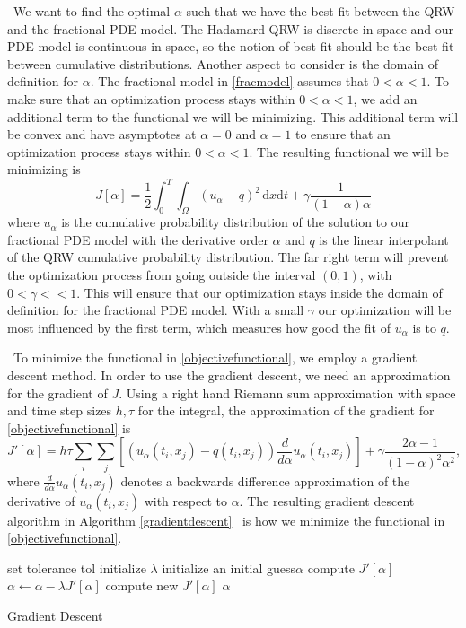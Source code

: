 \documentclass{siamart1116}
\newcommand{\LB}[1]{{\color{blue}~\textsf{#1}}}
\begin{document}
\LB{We want to find the optimal $\alpha$ such that we have the best fit between the QRW and the fractional PDE model. The Hadamard QRW is discrete in space and our PDE model is continuous in space, so the notion of best fit should be the best fit between cumulative distributions. Another aspect to consider is the domain of definition for $\alpha$. The fractional model in \eqref{fracmodel} assumes that $0<\alpha<1$. To make sure that an optimization process stays within $0<\alpha<1$, we add an additional term to the functional we will be minimizing. This additional term will be convex and have asymptotes at $\alpha=0$ and $\alpha = 1$ to ensure that an optimization process stays within $0<\alpha<1$. The resulting} functional we will be minimizing is 
\begin{equation}\label{objectivefunctional}
J[\alpha] = \frac{1}{2}\int_0^T\int_{\Omega}(u_\alpha-q)^2\, \mathrm{d}x\mathrm{d}t+\gamma\frac{1}{(1-\alpha)\alpha}
\end{equation}
where $u_\alpha$ is the cumulative probability distribution of the solution to our fractional PDE model with the derivative order $\alpha$ and $q$ is the linear interpolant of the QRW cumulative probability distribution. The far right term will prevent the optimization process from going outside the interval $(0,1)$, with $0<\gamma<<1$. This will ensure that our optimization stays inside the domain of definition for the fractional PDE model. With a small $\gamma$ our optimization will be most influenced by the first term, which measures how good the fit of $u_\alpha$ is to $q$. 

\LB{To minimize the functional in \eqref{objectivefunctional}, we employ a gradient descent method. In order to use the gradient descent, we need an approximation for the gradient of $J$.} Using a right hand Riemann sum approximation with space and time step sizes $h,\tau$ for the integral, the approximation of the gradient for \eqref{objectivefunctional} is
\begin{equation}\label{functionalgradient}
J'[\alpha] = h\tau\sum_{i}\sum_{j}\left[(u_\alpha(t_i,x_j)-q(t_i,x_j))\frac{d}{d\alpha}u_\alpha(t_i,x_j)\right]+\gamma\frac{2\alpha-1}{(1-\alpha)^2\alpha^2},
\end{equation}
where $\frac{d}{d\alpha}u_\alpha(t_i,x_j)$ denotes a backwards difference approximation of the derivative of $u_\alpha(t_i,x_j)$ with respect to $\alpha$. The resulting gradient descent algorithm in Algorithm \ref{gradientdescent} \LB{is how we minimize} the functional in \eqref{objectivefunctional}.
\begin{algorithm}[H]
\begin{algorithmic}[1]
\STATE set tolerance tol
\STATE initialize $\lambda$
\STATE initialize an initial guess$\alpha$
\STATE compute $J'[\alpha]$
\STATE $\alpha \leftarrow \alpha-\lambda J'[\alpha]$
\STATE compute new $J'[\alpha]$
\ENDWHILE
\RETURN $\alpha$
\end{algorithmic}
\caption{Gradient Descent }
\label{gradientdescent}
\end{algorithm}
\end{document}
